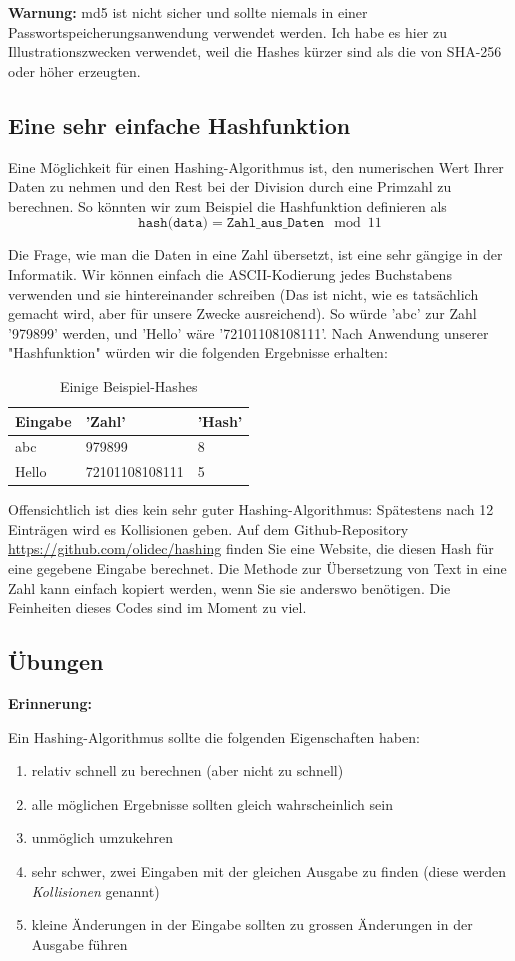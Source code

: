 \documentclass[11pt,a4paper]{report}
\begin{document}
\textbf{Warnung:} md5 ist nicht sicher und sollte niemals in einer Passwortspeicherungsanwendung verwendet werden.
Ich habe es hier zu Illustrationszwecken verwendet, weil die Hashes kürzer sind als die von SHA-256 oder höher erzeugten.

\subsection{Eine sehr einfache Hashfunktion}

Eine Möglichkeit für einen Hashing-Algorithmus ist, den numerischen Wert Ihrer Daten zu nehmen und den Rest bei der Division durch eine Primzahl zu berechnen.
So könnten wir zum Beispiel die Hashfunktion definieren als
\[
\texttt{hash(data)} = \texttt{Zahl\_aus\_Daten} \mod 11
\]

Die Frage, wie man die Daten in eine Zahl übersetzt, ist eine sehr gängige in der Informatik.
Wir können einfach die ASCII-Kodierung jedes Buchstabens verwenden und sie hintereinander schreiben (Das ist nicht, wie es tatsächlich gemacht wird, aber für unsere Zwecke ausreichend).
So würde 'abc' zur Zahl '979899' werden, und 'Hello' wäre '72101108108111'.
Nach Anwendung unserer "Hashfunktion" würden wir die folgenden Ergebnisse erhalten:

\begin{table}[h]
\centering
\begin{tabular}{|l|l|l|}
\hline
Eingabe & 'Zahl' & 'Hash' \\
\hline
abc & 979899 & 8 \\
Hello & 72101108108111 & 5 \\
\hline
\end{tabular}
\caption{Einige Beispiel-Hashes}
\end{table}


Offensichtlich ist dies kein sehr guter Hashing-Algorithmus: Spätestens nach 12 Einträgen wird es Kollisionen geben.
Auf dem Github-Repository \url{https://github.com/olidec/hashing} finden Sie eine Website, die diesen Hash für eine gegebene Eingabe berechnet.
Die Methode zur Übersetzung von Text in eine Zahl kann einfach kopiert werden, wenn Sie sie anderswo benötigen.
Die Feinheiten dieses Codes sind im Moment zu viel.
\subsection{Übungen}
{\bf Erinnerung: }

Ein Hashing-Algorithmus sollte die folgenden Eigenschaften haben:
\begin{enumerate}
\item  relativ schnell zu berechnen (aber nicht zu schnell)
\item  alle möglichen Ergebnisse sollten gleich wahrscheinlich sein
\item  unmöglich umzukehren
\item  sehr schwer, zwei Eingaben mit der gleichen Ausgabe zu finden (diese werden \emph{Kollisionen} genannt)
\item  kleine Änderungen in der Eingabe sollten zu grossen Änderungen in der Ausgabe führen
\end{enumerate}
\end{document}
